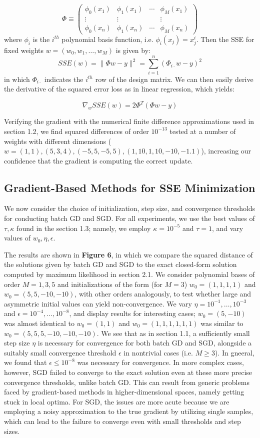 \documentclass[10pt,psamsfonts]{amsart}
\theoremstyle{definition}
\theoremstyle{remark}
\numberwithin{equation}{section}
\begin{document}
$$\Phi \equiv \begin{pmatrix} \phi_0(x_1) & \phi_1(x_1) & \cdots & \phi_M(x_1) \\ \vdots & \vdots &  & \vdots \\ \phi_0(x_n) & \phi_1(x_n) & \cdots & \phi_M(x_n)\end{pmatrix}$$ 
where $\phi_i$ is the $i^{th}$ polynomial basis function, i.e. $\phi_i(x_j) = x_j^i$. Then the SSE for fixed weights $w = (w_0, w_1, \dots, w_M)$ is given by:
$$SSE(w) = \|\Phi w - y\|^2 = \sum_{i=1}^n (\Phi_{i\cdot}w - y)^2$$
in which $\Phi_{i\cdot}$ indicates the $i^{th}$ row of the design matrix. We can then easily derive the derivative of the squared error loss as in linear regression, which yields:

$$\nabla_w SSE(w) = 2 \Phi^T(\Phi w - y)$$

Verifying the gradient with the numerical finite difference approximations used in section 1.2, we find squared differences of order $10^{-13}$ tested at a number of weights with different dimensions ($w = (1,1), (5,3,4), (-5,5,-5,5), (1,10,1,10,-10,-1.1)$), increasing our confidence that the gradient is computing the correct update.

\subsection{Gradient-Based Methods for SSE Minimization} We now consider the choice of initialization, step size, and convergence thresholds for conducting batch GD and SGD. For all experiments, we use the best values of $\tau, \kappa$ found in the section 1.3; namely, we employ $\kappa = 10^{-5}$ and $\tau = 1$, and vary values of $w_0, \eta, \epsilon$. 

The results are shown in {\bf Figure 6}, in which we compare the squared distance of the solutions given by batch GD and SGD to the exact closed-form solution computed by maximum likelihood in section 2.1. We consider polynomial bases of order $M=1, 3, 5$ and initializations of the form (for $M = 3$) $w_0 = (1,1,1,1)$ and $w_0 = (5,5,-10,-10)$, with other orders analogously, to test whether large and asymmetric initial values can yield non-convergence. We vary $\eta = 10^{-1}, \dots, 10^{-3}$ and $\epsilon = 10^{-4}, \dots, 10^{-8}$, and display results for interesting cases; $w_0 = (5,-10)$ was almost identical to $w_0 = (1,1)$ and $w_0 = (1,1,1,1,1,1)$ was similar to $w_0 = (5,5,5,-10,-10,-10)$. We see that as in section 1.1, a sufficiently small step size $\eta$ is necessary for convergence for both batch GD and SGD, alongside a suitably small convergence threshold $\epsilon$ in nontrivial cases (i.e. $M \geq 3$). In gneeral, we found that $\epsilon \leq 10^{-8}$ was necessary for convergence. In more complex cases, however, SGD failed to converge to the exact solution even at these more precise convergence thresholds, unlike batch GD. This can result from generic problems faced by gradient-based methods in higher-dimensional spaces, namely getting stuck in local optima. For SGD, the issues are more acute because we are employing a noisy approximation to the true gradient by utilizing single samples, which can lead to the failure to converge even with small thresholds and step sizes.
\end{document}
